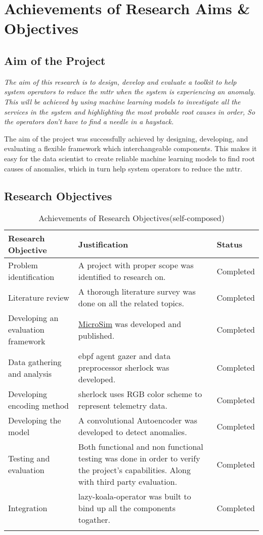 \section{Achievements of Research Aims \& Objectives}

\subsection{Aim of the Project}

\textit{The aim of this research is to design, develop and evaluate a toolkit to help system operators to reduce the \ac{mttr} when the system is experiencing an anomaly. This will be achieved by using machine learning models to investigate all the services in the system and highlighting the most probable root causes in order, So the operators don’t have to find a needle in a haystack.}

The aim of the project was successfully achieved by designing, developing, and evaluating a flexible framework which interchangeable components. This makes it easy for the data scientist to create reliable machine learning models to find root causes of anomalies, which in turn help system operators to reduce the \ac{mttr}.


\subsection{Research Objectives}

\begin{longtable}{|p{40mm}|p{91mm}|p{20mm}|}
    \hline
    \textbf{Research Objective} & \textbf{Justification} & \textbf{Status} \\ \hline
    Problem identification & A project with proper scope was identified to research on. & Completed \\ \hline
    Literature review & A thorough literature survey was done on all the related topics. & Completed \\ \hline
    Developing an evaluation framework & \href{https://github.com/MrSupiri/MicroSim}{MicroSim} was developed and published. & Completed \\ \hline
    Data gathering and analysis & \ac{ebpf} agent \ac{gazer} and data preprocessor \ac{sherlock} was developed. & Completed \\ \hline
    Developing encoding method & \ac{sherlock} uses RGB color scheme to represent telemetry data. & Completed \\ \hline
    Developing the model & A convolutional Autoencoder was developed to detect anomalies. & Completed \\ \hline
    Testing and evaluation & Both functional and non functional testing was done in order to verify the project’s capabilities. Along with third party evaluation. & Completed \\ \hline
    Integration & \ac{lazy-koala-operator} was built to bind up all the components togather. & Completed \\ \hline
    \caption{Achievements of Research Objectives(self-composed)}
  \end{longtable}
  
  